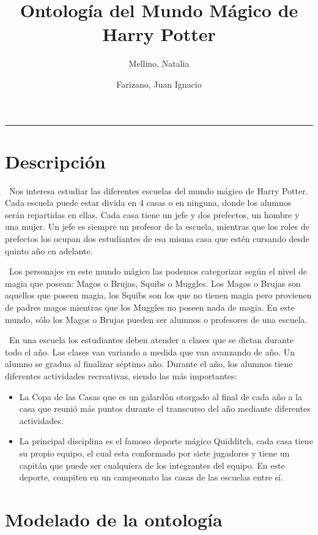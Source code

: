 \documentclass[11pt]{article}
\title{
    Ontología del Mundo Mágico de Harry Potter}
\author{Mellino, Natalia \and Farizano, Juan Ignacio}
\date{}
\begin{document}
\maketitle

\noindent\rule{\textwidth}{1pt}

\section{Descripción}

\-\ Nos interesa estudiar las diferentes escuelas del mundo mágico de Harry Potter.
Cada escuela puede estar divida en 4 casas o en ninguna, donde los alumnos serán 
repartidas en ellas. Cada casa tiene un jefe y dos prefectos, un hombre y una 
mujer. Un jefe es siempre un profesor de la escuela, mientras que los roles de 
prefectos los ocupan dos estudiantes de esa misma casa que estén cursando desde 
quinto año en adelante.

\-\ Los personajes en este mundo mágico las podemos categorizar según el nivel de 
magia que posean: Magos o Brujas, Squibs o Muggles. Los Magos o Brujas son 
aquellos que poseen magia, los Squibs son los que no tienen magia pero provienen 
de padres magos mientras que los Muggles no poseen nada de magia. En este mundo, 
sólo los Magos o Brujas pueden ser alumnos o profesores de una escuela.

\-\ En una escuela los estudiantes deben atender a clases que se dictan durante todo 
el año. Las clases van variando a medida que van avanzando de año. Un alumno se 
gradua al finalizar séptimo año.
Durante el año, los alumnos tiene diferentes actividades recreativas, siendo las 
más importantes:
    \begin{itemize}
        \item La Copa de las Casas que es un galardón otorgado al final de cada 
        año a la casa que reunió más puntos durante el transcurso del año 
        mediante diferentes actividades.
        \item La principal disciplina es el famoso deporte mágico Quidditch, 
        cada casa tiene su propio equipo, el cual esta conformado por siete 
        jugadores y tiene un capitán que puede ser cualquiera de los integrantes 
        del equipo. En este deporte, compiten en un campeonato las casas de las 
        escuelas entre sí. 
    \end{itemize}

\section{Modelado de la ontología}
\end{document}
